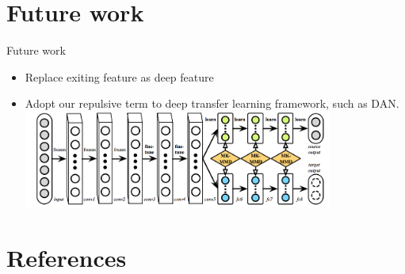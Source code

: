 \documentclass{beamer}
\begin{document}
\section{Future work}
\begin{frame}
{Future work}
\begin{itemize}
\item Replace exiting feature as deep feature
\item Adopt our repulsive term to deep transfer learning framework, such as DAN.\\
\includegraphics[width=0.8\textwidth]{figs/dan.png}
\end{itemize}
\end{frame}

\section{References}
\begin{frame}
\begin{columns}[totalwidth=\textwidth]
\begin{column}{\textwidth}
\end{column}
\end{columns}
\end{frame}
\end{document}
